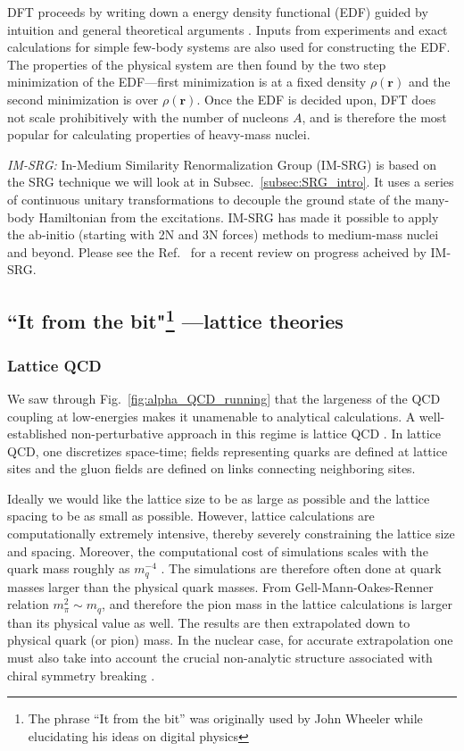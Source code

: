 	DFT proceeds by writing down a energy density functional (EDF) guided by
	intuition and general theoretical arguments
	\cite{Drut:2009ce, Dobaczewski:2010gr}.  Inputs from experiments
	and exact calculations for simple few-body systems are also used for
	constructing the EDF.  The properties of the physical system are then found
	by the two step minimization of the EDF---first minimization is at a fixed
	density $\rho(\bm{r})$ and the second minimization is over $\rho(\bm{r})$.
	Once the EDF is decided upon, DFT does not scale prohibitively with
	the number of nucleons $A$, and is therefore the most popular for
	calculating properties of heavy-mass nuclei.

	\li
	\emph{IM-SRG:} In-Medium Similarity Renormalization Group (IM-SRG) is
	based on the SRG technique we will look at in Subsec.~\ref{subsec:SRG_intro}.
	It uses a series of continuous unitary transformations to decouple
	the ground state of the many-body Hamiltonian from the excitations.
	IM-SRG has made it possible to apply the ab-initio (starting with 2N and
	3N forces) methods to medium-mass nuclei and beyond.  Please see the
	Ref.~\cite{Hergert:2015awm} for a recent review on progress acheived by
	IM-SRG.
	\ei

	\subsection[``It from the bit"---lattice theories]%
	{``It from the bit"\footnote{The phrase ``It from the bit'' was originally
	used by John Wheeler while elucidating his ideas on digital physics}
	---lattice theories}
	\label{subsec:lattice_theories}

	\medskip
	\subsubsection{Lattice QCD}

	We saw through Fig.~\ref{fig:alpha_QCD_running} that the largeness of the
	QCD coupling at low-energies makes it unamenable to analytical calculations.
	A well-established non-perturbative approach in this regime is lattice
	QCD \cite{Savage:2015eya}.  In lattice QCD, one discretizes space-time;
	fields representing quarks are defined at lattice sites and
	the gluon fields are defined on links connecting neighboring sites.

	Ideally we would like the lattice size to be as large as possible and the
	lattice spacing to be as
	small as possible.  However, lattice calculations are computationally
	extremely intensive, thereby severely
	constraining the lattice size and spacing.  Moreover, the computational
	cost of simulations
	scales with the quark mass roughly as $m_q ^{-4}$
	\cite{Detmold:2003rq}.  The simulations
	are therefore often done at quark masses larger than the physical quark
	masses.  From Gell-Mann-Oakes-Renner relation $m_\pi ^2 \sim m_q$,
	and therefore the pion mass
	in the lattice calculations is larger than its physical value as well.
	The results
	are then extrapolated down to physical quark (or pion) mass.
	In the nuclear case, for accurate extrapolation one must also take into
	account the crucial
	non-analytic structure associated with chiral symmetry breaking
	\cite{Detmold:2001jb}.

